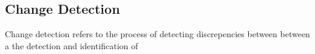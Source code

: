 \subsection{Change Detection}

Change detection refers to the process of detecting discrepencies between between a  the detection and identification of 